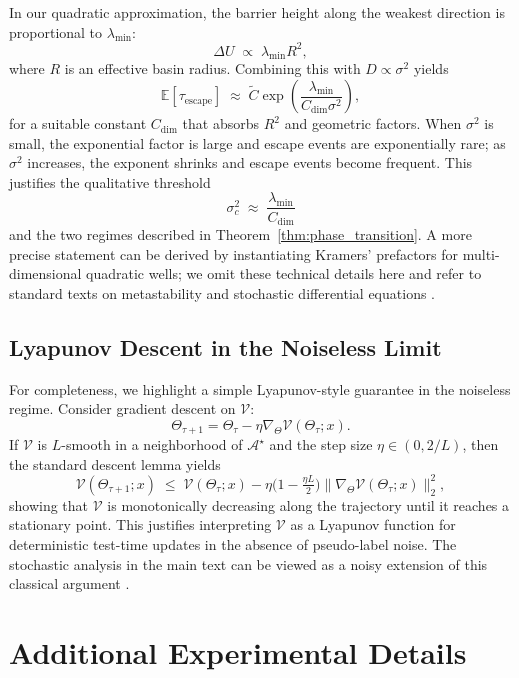 \documentclass{article}
\theoremstyle{plain}
\theoremstyle{definition}
\theoremstyle{remark}
\newcommand{\E}{\mathbb{E}}
\newcommand{\Lyap}{\mathcal{V}}            %
\newcommand{\Attractor}{\mathcal{A}}       %
\begin{document}
In our quadratic approximation, the barrier height along the weakest direction is proportional to $\lambda_{\min}$:
\[
\Delta U \;\propto\; \lambda_{\min} R^2,
\]
where $R$ is an effective basin radius. Combining this with $D \propto \sigma^2$ yields
\[
\E[\tau_{\mathrm{escape}}]
\;\approx\;
\tilde{C}
\exp\!\left(\frac{\lambda_{\min}}{C_{\mathrm{dim}} \sigma^2}\right),
\]
for a suitable constant $C_{\mathrm{dim}}$ that absorbs $R^2$ and geometric factors. When $\sigma^2$ is small, the exponential factor is large and escape events are exponentially rare; as $\sigma^2$ increases, the exponent shrinks and escape events become frequent. This justifies the qualitative threshold
\[
\sigma_c^2 \;\approx\; \frac{\lambda_{\min}}{C_{\mathrm{dim}}}
\]
and the two regimes described in Theorem~\ref{thm:phase_transition}. A more precise statement can be derived by instantiating Kramers' prefactors for multi-dimensional quadratic wells; we omit these technical details here and refer to standard texts on metastability and stochastic differential equations \cite{oksendal2003stochastic,strogatz2018}.

\subsection{Lyapunov Descent in the Noiseless Limit}

For completeness, we highlight a simple Lyapunov-style guarantee in the noiseless regime. Consider gradient descent on $\Lyap$:
\[
\Theta_{\tau+1} = \Theta_{\tau} - \eta \nabla_{\Theta} \Lyap(\Theta_{\tau};x).
\]
If $\Lyap$ is $L$-smooth in a neighborhood of $\Attractor^\star$ and the step size $\eta \in (0,2/L)$, then the standard descent lemma yields
\[
\Lyap(\Theta_{\tau+1};x)
\;\le\;
\Lyap(\Theta_{\tau};x)
- \eta\Big(1-\tfrac{\eta L}{2}\Big)\big\|\nabla_{\Theta} \Lyap(\Theta_{\tau};x)\big\|_2^2,
\]
showing that $\Lyap$ is monotonically decreasing along the trajectory until it reaches a stationary point. This justifies interpreting $\Lyap$ as a Lyapunov function for deterministic test-time updates in the absence of pseudo-label noise. The stochastic analysis in the main text can be viewed as a noisy extension of this classical argument \cite{khalil2002lyapunov,borkar2000ode}.

\section{Additional Experimental Details}
\label{app:details}
\end{document}

